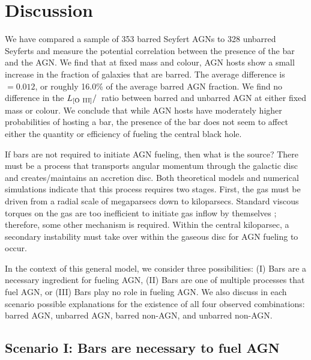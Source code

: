\section{Discussion}\label{sec:Discussion}


We have compared a sample of 353 barred Seyfert AGNs to 328 unbarred Seyferts and measure the potential correlation between the presence of the bar and the AGN. We find that at fixed mass and colour, AGN hosts show a small increase in the fraction of galaxies that are barred. The average difference is \db~$=0.012$, or roughly 16.0\% of the average barred AGN fraction. We find no difference in the $L_{\rm{[O~III]}}/$\mbh~ratio between barred and unbarred AGN at either fixed mass or colour. We conclude that while AGN hosts have moderately higher probabilities of hosting a bar, the presence of the bar does not seem to affect either the quantity or efficiency of fueling the central black hole.  

If bars are not required to initiate AGN fueling, then what is the source? There must be a process that transports angular momentum through the galactic disc and creates/maintains an accretion disc. Both theoretical models \citep{Shlos89,Shlos90} and numerical simulations \citep{HandQ10} indicate that this process requires two stages. First, the gas must be driven from a radial scale of megaparsecs down to kiloparsecs. Standard viscous torques on the gas are too inefficient to initiate gas inflow by themselves \citet{Shlos89,Bournaud05}; therefore, some other mechanism is required. Within the central kiloparsec, a secondary instability must take over within the gaseous disc for AGN fueling to occur.
 
In the context of this general model, we consider three possibilities: (I) Bars are a necessary ingredient for fueling AGN, (II) Bars are one of multiple processes that fuel AGN, or (III) Bars play no role in fueling AGN. We also discuss in each scenario possible explanations for the existence of all four observed combinations: barred AGN, unbarred AGN, barred non-AGN, and unbarred non-AGN. 

\subsection{Scenario I: Bars are necessary to fuel AGN}\label{ssec:scenario1}

